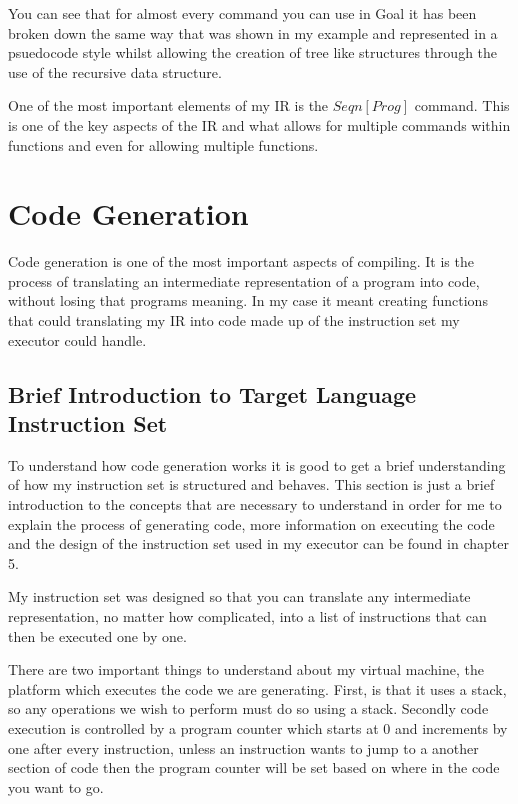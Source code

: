 You can see that for almost every command you can use in Goal it has been broken down the same way that was shown in my example and represented in a psuedocode style whilst allowing the creation of tree like structures through the use of the recursive data structure.

One of the most important elements of my IR is the $Seqn [Prog]$ command. This is one of the key aspects of the IR and what allows for multiple commands within functions and even for allowing multiple functions.


\section{Code Generation}

Code generation is one of the most important aspects of compiling. It is the process of translating an intermediate representation of a program into code, without losing that programs meaning. In my case it meant creating functions that could translating my IR into code made up of the instruction set my executor could handle.  


\subsection{Brief Introduction to Target Language Instruction Set}

To understand how code generation works it is good to get a brief understanding of how my instruction set is structured and behaves. This section is just a brief introduction to the concepts that are necessary to understand in order for me to explain the process of generating code, more information on executing the code and the design of the instruction set used in my executor can be found in chapter 5.

My instruction set was designed so that you can translate any intermediate representation, no matter how complicated, into a list of instructions that can then be executed one by one. 

There are two important things to understand about my virtual machine, the platform which executes the code we are generating. First, is that it uses a stack, so any operations we wish to perform must do so using a stack. Secondly code execution is controlled by a program counter which starts at 0 and increments by one after every instruction, unless an instruction wants to jump to a another section of code then the program counter will be set based on where in the code you want to go. 

